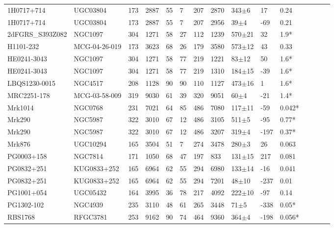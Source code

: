 \documentclass[twocolumn,tighten]{aastex6}
\begin{document}
\begin{table}[ht]
\begin{center}
\begin{tabular}{l l l l l l l l l l l l l l l}
1H0717+714  &  UGC03804  &  173  &  2887  &  55  &  7  &  207  &  2870  &  343$\pm$6  &  17  &  0.24  \\
1H0717+714  &  UGC03804  &  173  &  2887  &  55  &  7  &  207  &  2956  &  39$\pm$4  &  -69  &  0.21  \\
2dFGRS\_S393Z082  &  NGC1097  &  304  &  1271  &  58  &  27  &  112  &  1239  &  570$\pm$21  &  32  &  1.9*  \\
H1101-232  &  MCG-04-26-019  &  173  &  3623  &  68  &  26  &  179  &  3580  &  573$\pm$12  &  43  &  0.33  \\
HE0241-3043  &  NGC1097  &  304  &  1271  &  58  &  77  &  219  &  1221  &  83$\pm$12  &  50  &  1.6*  \\
HE0241-3043  &  NGC1097  &  304  &  1271  &  58  &  77  &  219  &  1310  &  184$\pm$15  &  -39  &  1.6*  \\
LBQS1230-0015  &  NGC4517  &  208  &  1128  &  90  &  90  &  110  &  1127  &  473$\pm$16  &  1  &  1.6*  \\
MRC2251-178  &  MCG-03-58-009  &  319  &  9030  &  61  &  39  &  320  &  9051  &  60$\pm$4  &  -21  &  1.4*  \\
Mrk1014  &  NGC0768  &  231  &  7021  &  64  &  85  &  486  &  7080  &  117$\pm$11  &  -59  &  0.042*  \\
Mrk290  &  NGC5987  &  322  &  3010  &  67  &  12  &  486  &  3105  &  511$\pm$5  &  -95  &  0.77*  \\
Mrk290  &  NGC5987  &  322  &  3010  &  67  &  12  &  486  &  3207  &  319$\pm$4  &  -197  &  0.37*  \\
Mrk876  &  UGC10294  &  165  &  3504  &  51  &  7  &  274  &  3478  &  280$\pm$3  &  26  &  0.063  \\
PG0003+158  &  NGC7814  &  171  &  1050  &  68  &  47  &  197  &  833  &  131$\pm$15  &  217  &  0.081  \\
PG0832+251  &  KUG0833+252  &  165  &  6964  &  62  &  55  &  294  &  6980  &  133$\pm$14  &  -16  &  0.041  \\
PG0832+251  &  KUG0833+252  &  165  &  6964  &  62  &  55  &  294  &  7201  &  48$\pm$10  &  -237  &  0.01  \\
PG1001+054  &  UGC05432  &  164  &  3995  &  36  &  78  &  217  &  4092  &  222$\pm$10  &  -97  &  0.14  \\
PG1302-102  &  NGC4939  &  235  &  3110  &  48  &  61  &  265  &  3448  &  71$\pm$5  &  -338  &  0.05*  \\
RBS1768  &  RFGC3781  &  253  &  9162  &  90  &  74  &  464  &  9360  &  364$\pm$4  &  -198  &  0.056*  \\

\end{tabular}
\end{center}
\end{table}
\end{document}
